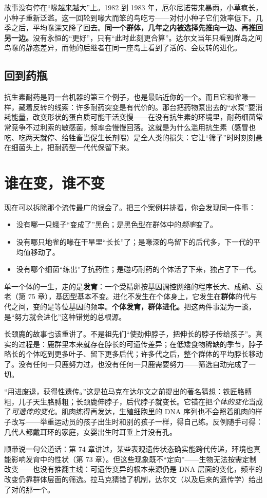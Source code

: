 故事没有停在“喙越来越大”上。1982 到 1983 年，厄尔尼诺带来暴雨，小草疯长，小种子重新泛滥。这一回轮到喙大而笨的鸟吃亏——对付小种子它们效率低下。几季之后，平均喙深又降了回去。\textbf{同一个群体，几年之内被选择先推向一边、再推回另一边。}没有永恒的“更好”，只有“此时此刻更合算”。达尔文当年只看到群岛之间鸟喙的静态差异，而他的后继者在同一座岛上看到了活的、会反转的进化。

\subsection{回到药瓶}

抗生素耐药是同一台机器的第三个例子，也是最贴近你的一个。而且它和雀喙一样，藏着反转的线索：许多耐药突变是有代价的。那台把药物泵出去的“水泵”要消耗能量，改变形状的蛋白质可能干活变慢——在没有抗生素的环境里，耐药细菌常常竞争不过利索的敏感菌，频率会慢慢回落。这就是为什么滥用抗生素（感冒也吃、吃两天就停、给牲畜当促生长剂喂）是全人类的损失：它让“筛子”时时刻刻悬在细菌头上，把耐药型一代代保留下来。

\section{谁在变，谁不变}

现在可以拆除那个流传最广的误会了。把三个案例并排看，你会发现同一件事：

\begin{itemize}[itemsep=2pt]
\item 没有哪一只蛾子“变成了”黑色；是黑色型在群体中的\emph{频率}变了。
\item 没有哪只地雀的喙在干旱里“长长”了；是喙深的鸟留下的后代多，下一代的平均值移动了。
\item 没有哪个细菌“练出”了抗药性；是碰巧耐药的个体活了下来，独占了下一代。
\end{itemize}

单一个体的一生，走的是\textbf{发育}：一个受精卵按基因调控网络的程序长大、成熟、衰老（第 75 章），基因型基本不变。进化不发生在个体身上，它发生在\textbf{群体}的代与代之间，变的是等位基因的频率。\textbf{个体发育，群体进化。}把这两件事混为一谈，是“努力就会进化”这种错觉的总根源。

长颈鹿的故事也该重讲了。不是祖先们“使劲伸脖子，把伸长的脖子传给孩子”。真实的过程是：鹿群里本来就存在脖长的可遗传差异；在低矮食物稀缺的季节，脖子略长的个体吃到更多叶子、留下更多后代；许多代之后，整个群体的平均脖长移动了。没有任何一只鹿努力过，也没有任何一只鹿需要努力——筛选自动完成了一切。

\begin{wuqu}
“用进废退，获得性遗传。”这是拉马克在达尔文之前提出的著名猜想：铁匠胳膊粗，儿子天生胳膊粗；长颈鹿伸脖子，后代脖子就变长。它错在把\emph{个体的变化}当成了\emph{可遗传的变化}。肌肉练得再发达，生殖细胞里的 DNA 序列也不会照着肌肉的样子改写——举重运动员的孩子出生时和别的孩子一样，得自己练。反例随手可得：几代人都戴耳环的家庭，女婴出生时耳垂上并没有孔。

顺带说一句公道话：第 74 章讲过，某些表观遗传状态确实能跨代传递，环境也真能影响发育中的性状（第 73 章）。但这些现象既不“定向”——生物无法按需定制改变——也没有推翻主线：可遗传变异的根本来源仍是 DNA 层面的变化，频率的改变仍靠群体层面的筛选。拉马克猜错了机制，达尔文（以及后来的遗传学）给出了对的那一个。
\end{wuqu}


